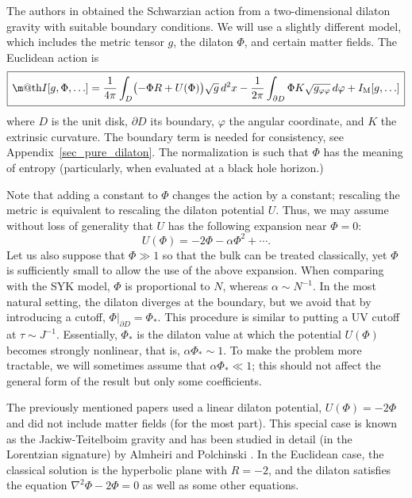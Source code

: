 \documentclass[12pt]{article}
\makeatletter
\newcommand*{\wideboxed}[1]{\setlength{\fboxsep}{1ex}%
  \fbox{\m@th$\displaystyle#1$}}
\newcommand{\ph}{\varphi}
\newcommand{\Matter}{\mathrm{M}}
\makeatother
\begin{document}
The authors in \cite{Jen16, MSY16, EMV16} obtained the Schwarzian action from a two-dimensional dilaton gravity with suitable boundary conditions. We will use a slightly different model, which includes the metric tensor $g$, the dilaton $\Phi$, and certain matter fields. The Euclidean action is
\begin{equation}\label{dilact}
\wideboxed{
I[g,\Phi,\ldots]
=\frac{1}{4\pi}\int_{D} \bigl(-\Phi R+U(\Phi)\bigr)\sqrt{g}\,d^2x
-\frac{1}{2\pi}\int_{\partial D}\Phi K\sqrt{g_{\ph\ph}}\,d\ph
+I_{\Matter}[g,\ldots]
}
\end{equation}
where $D$ is the unit disk, $\partial D$ its boundary, $\ph$ the angular coordinate, and $K$ the extrinsic curvature. The boundary term is needed for consistency, see Appendix~\ref{sec_pure_dilaton}. The normalization is such that $\Phi$ has the meaning of entropy (particularly, when evaluated at a black hole horizon.)

Note that adding a constant to $\Phi$ changes the action by a constant; rescaling the metric is equivalent to rescaling the dilaton potential $U$. Thus, we may assume without loss of generality that $U$ has the following expansion near $\Phi=0$:
\begin{equation}\label{U_expansion}
U(\Phi)= -2\Phi-\alpha\Phi^2+\cdots.
\end{equation}
Let us also suppose that $\Phi\gg 1$ so that the bulk can be treated classically, yet $\Phi$ is sufficiently small to allow the use of the above expansion.  When comparing with the SYK model, $\Phi$ is proportional to $N$, whereas $\alpha\sim N^{-1}$. In the most natural setting, the dilaton diverges at the boundary, but we avoid that by introducing a cutoff, $\Phi|_{\partial D}=\Phi_*$. This procedure is similar to putting a UV cutoff at $\tau\sim J^{-1}$.  Essentially, $\Phi_*$ is the dilaton value at which the potential $U(\Phi)$ becomes strongly nonlinear, that is, $\alpha\Phi_*\sim 1$. To make the problem more tractable, we will sometimes assume that $\alpha\Phi_*\ll 1$; this should not affect the general form of the result but only some coefficients.

The previously mentioned papers \cite{Jen16, MSY16, EMV16} used a linear dilaton potential, $U(\Phi)=-2\Phi$ and did not include matter fields (for the most part). This special case is known as the Jackiw-Teitelboim gravity \cite{Ja85, Te83} and has been studied in detail (in the Lorentzian signature) by Almheiri and Polchinski \cite{AlPo14}. In the Euclidean case, the classical solution is the hyperbolic plane with $R=-2$, and the dilaton satisfies the equation $\nabla^2\Phi-2\Phi=0$ as well as some other equations.
\end{document}
